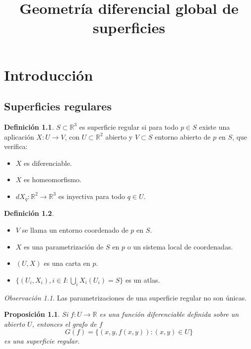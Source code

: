 \documentclass{report}
\title{Geometría diferencial global de superficies}
\author{}
\newtheorem{proposition}[theorem]{Proposición}
\theoremstyle{remark}
\newtheorem*{remark}{Observación}
\theoremstyle{remark}
\theoremstyle{definition}
\newtheorem{definition}{Definición}[chapter]
\theoremstyle{definition}
\theoremstyle{definition}
\begin{document}
\maketitle
\tableofcontents

\chapter{Introducción}
\section{Superficies regulares}

\begin{definition}
    $S \subset \mathbb{R}^3$ es superficie regular si para todo $p \in S$ existe una aplicación $X : U \to V$, con $U \subset \mathbb{R}^2$ abierto y $V \subset S$ entorno abierto de $p$ en $S$, que verifica:
    \begin{itemize}
        \item $X$ es diferenciable.
        \item $X$ es homeomorfismo.
        \item $dX_q : \mathbb{R}^2 \to \mathbb{R}^3$ es inyectiva para todo $q \in U$.
    \end{itemize}
\end{definition}

\begin{definition}
    \hfill
    \begin{itemize}
        \item $V$ se llama un entorno coordenado de $p$ en $S$.
        \item $X$ es una parametrización de $S$ en $p$ o un sistema local de coordenadas.
        \item $(U, X)$ es una carta en $p$.
        \item $\{ (U_i, X_i), i \in I : \bigcup_i X_i(U_i) = S \}$ es un atlas.
    \end{itemize}
\end{definition}

\begin{remark}
    Las parametrizaciones de una superficie regular no son únicas.
\end{remark}

\begin{proposition}
    Si $f : U \to \mathbb{R}$ es una función diferenciable definida sobre un abierto $U$, entonces el grafo de $f$
    $$G(f) = \{ (x, y, f(x, y)) : (x, y) \in U \}$$
    es una superficie regular.
\end{proposition}
\end{document}
